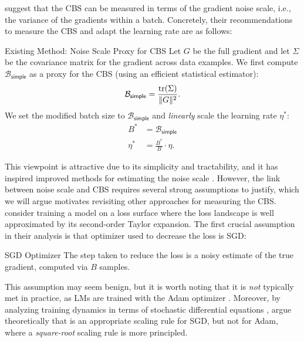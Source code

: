 \documentclass{article}
\begin{document}
\citet{mccandlish2018empirical} suggest that the CBS can be measured in terms of the gradient noise scale, i.e., the variance of the gradients within a batch.
Concretely, their recommendations to measure the CBS and adapt the learning rate are as follows:

\begin{methodbox}{Existing Method: Noise Scale Proxy for CBS \citep{mccandlish2018empirical}}
    Let $G$ be the full gradient and let $\Sigma$ be the covariance matrix for the gradient across data examples.
    We first compute $\mathcal B_\mathsf{simple}$ as a proxy for the CBS (using an efficient statistical estimator):
    \begin{equation*}
        \mathcal B_\mathsf{simple} = \frac{\mathrm{tr}(\Sigma)}{\lVert G\rVert^2} . \label{eq:noise-scale}
    \end{equation*}
    We set the modified batch size to $\mathcal B_\mathsf{simple}$ and \emph{linearly} scale the learning rate $\eta^*$:
    \begin{align}
        B^* &= \mathcal B_\mathsf{simple} \\
        \eta^* &= \frac{B^*}{B} \cdot \eta . \label{eq:linear-scaling}
    \end{align}
\end{methodbox}

This viewpoint is attractive due to its simplicity and tractability, and it has inspired improved methods for estimating the noise scale \citep{gray2023efficient,gray2024normalization}.
However, the link between noise scale and CBS requires several strong assumptions to justify, which we will argue motivates revisiting other approaches for measuring the CBS.
\citet{mccandlish2018empirical} consider training a model on a loss surface where the loss landscape is well approximated by its second-order Taylor expansion.
The first crucial assumption in their analysis is that optimizer used to decrease the loss is SGD:

\begin{assumptionbox}{SGD Optimizer \citep{mccandlish2018empirical}}
    The step taken to reduce the loss is a noisy estimate of the true gradient, computed via $B$ samples.
\end{assumptionbox}

This assumption may seem benign, but it is worth noting that it is \emph{not} typically met in practice, as LMs are trained with the Adam optimizer \citep{kingma-2017-adam}.
Moreover, by analyzing training dynamics in terms of stochastic differential equations \citep{li2021validity}, \citet{malladi2022sdes} argue theoretically that  is an appropriate scaling rule for SGD, but not for Adam, where a \emph{square-root} scaling rule is more principled.
\end{document}
